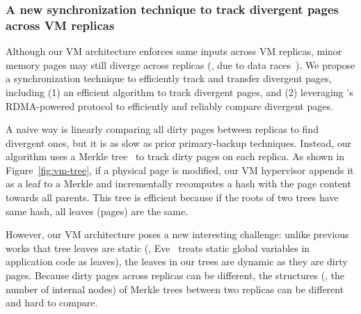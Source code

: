 
\vspace{-.15in}\subsubsection{A new synchronization technique to 
track divergent pages across VM replicas}
\label{sec:tracking}\vspace{-.075in}



Although our VM architecture enforces same inputs across VM replicas, 
minor memory pages may still diverge across replicas (\eg, due to 
data races~\cite{lu:concurrency-bugs}). We propose a synchronization 
technique to efficiently track and transfer divergent pages, including (1) 
an efficient  algorithm to track divergent pages, and (2) 
leveraging \falcon's RDMA-powered protocol to efficiently and reliably compare 
divergent pages.

A naive way is linearly comparing all  dirty pages between replicas to 
find divergent ones, but it is as slow as prior primary-backup 
techniques. Instead, our algorithm uses a Merkle tree~\cite{eve:osdi12} to track 
dirty pages on each replica. As shown in Figure~\ref{fig:vm-tree}, if a 
physical page is modified, our VM hypervisor appends it as a leaf to a
Merkle and incrementally recomputes a  hash with the page content towards all 
parents. This tree is efficient because if the roots of two trees 
have same hash, all leaves (pages) are the same.

However, our VM architecture poses a new interesting challenge: unlike 
previous works that tree leaves are static (\eg, Eve~\cite{eve:osdi12} treats 
static global variables in application code as leaves), the leaves in our trees 
are dynamic as they are dirty pages. Because dirty pages across replicas can be 
different, the structures (\ie, the number of internal nodes) of Merkle trees 
between two replicas can be different and hard to compare.

